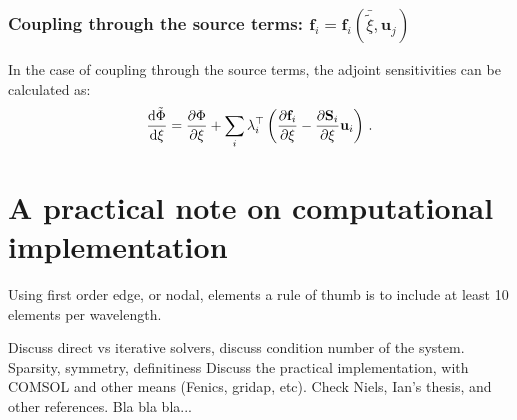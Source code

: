 \subsubsection*{Coupling through the source terms: $\mathbf{f}_i =
        \mathbf{f}_i(\bar{\tilde{\xi}}, \mathbf{u}_j)$}

In the case of coupling through the source terms, the adjoint sensitivities can
be calculated as:
\begin{equation}
    \frac{\mathop{}\!\text{d} \tilde{\Phi}}{\mathop{}\!\text{d} \xi} = \frac{\partial \Phi}{\partial \xi} +
    \sum_i \lambda_{i}^{\top} \left( \frac{\partial \mathbf{f}_i}{\partial \xi} -
    \frac{\partial \mathbf{S}_i}{\partial \xi} \mathbf{u}_i  \right)\,.
\end{equation}

\section{A practical note on computational implementation}

Using first order edge, or nodal, elements a rule of thumb is to include at
least 10 elements per wavelength.

Discuss direct vs iterative solvers, discuss condition number of the system.
Sparsity, symmetry, definitiness
Discuss the practical implementation, with COMSOL and other means (Fenics,
gridap, etc).
Check Niels, Ian's thesis, and other references.
Bla bla bla...